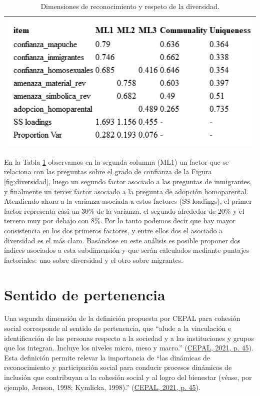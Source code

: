 \documentclass[
  12pt,
]{book}
\begin{document}
\begin{longtable}[]{@{}l@{}}
\caption{\label{tab:div-fa}Dimensiones de reconocimiento y respeto de la diversidad.}\tabularnewline
\toprule
\endhead
\includegraphics[width=5.20833in,height=\textheight]{output/tables/div_fa.png} \\
\bottomrule
\end{longtable}

En la Tabla \ref{tab:div-fa} observamos en la segunda columna (ML1) un factor que se relaciona con las preguntas sobre el grado de confianza de la Figura \ref{fig:diversidad}, luego un segundo factor asociado a las preguntas de inmigrantes, y finalmente un tercer factor asociado a la pregunta de adopción homoparental. Atendiendo ahora a la varianza asociada a estos factores (SS loadings), el primer factor representa casi un 30\% de la varianza, el segundo alrededor de 20\% y el tercero muy por debajo con 8\%. Por lo tanto podemos decir que hay mayor consistencia en los dos primeros factores, y entre ellos dos el asociado a diversidad es el más claro. Basándose en este análisis es posible proponer dos índices asociados a esta subdimensión y que serán calculados mediante puntajes factoriales: uno sobre diversidad y el otro sobre migrantes.

\hypertarget{sentido-de-pertenencia}{%
\section{Sentido de pertenencia}\label{sentido-de-pertenencia}}

Una segunda dimensión de la definición propuesta por CEPAL para cohesión social corresponde al sentido de pertenencia, que ``alude a la vinculación e identificación de las personas respecto a la sociedad y a las instituciones y grupos que los integran. Incluye los niveles micro, meso y macro.'' (\protect\hyperlink{ref-cepal_Cohesion_2021}{CEPAL, 2021, p. 45}). Esta definición permite relevar la importancia de ``las dinámicas de reconocimiento y participación social para conducir procesos dinámicos de inclusión que contribuyan a la cohesión social y al logro del bienestar (véase, por ejemplo, Jenson, 1998; Kymlicka, 1998).'' (\protect\hyperlink{ref-cepal_Cohesion_2021}{CEPAL, 2021, p. 45}).
\end{document}
